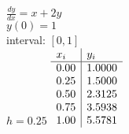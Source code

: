 {
$\displaystyle \frac{dy}{dx} = x+2y$\\
$y(0)=1$\\
interval: $[0,1]$\\
$h=0.25$
}
{
	$\begin{array}[b]{l | l}
		x_i  & y_i    \\ \hline
		0.00    & 1.0000 \\
		0.25 & 1.5000 \\
		0.50  & 2.3125 \\
		0.75 & 3.5938 \\
		1.00  & 5.5781
	\end{array}$
}